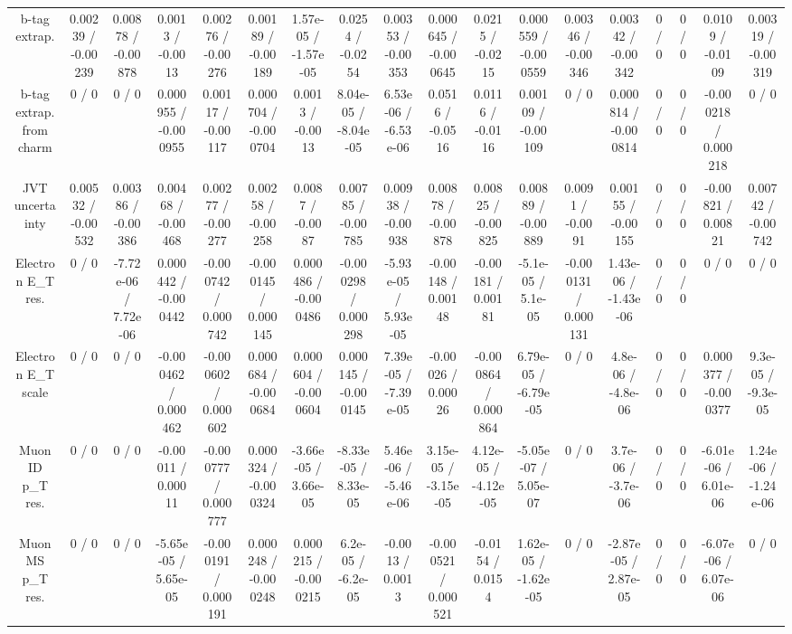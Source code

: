 \documentclass[10pt]{article}
\begin{document}
\begin{table}[htbp]
\begin{center}
\begin{tabular}{|c|c|c|c|c|c|c|c|c|c|c|c|c|c|c|c|c|c|}
  b-tag extrap. & 0.00239 / -0.00239 & 0.00878 / -0.00878 & 0.0013 / -0.0013 & 0.00276 / -0.00276 & 0.00189 / -0.00189 & 1.57e-05 / -1.57e-05 & 0.0254 / -0.0254 & 0.00353 / -0.00353 & 0.000645 / -0.000645 & 0.0215 / -0.0215 & 0.000559 / -0.000559 & 0.00346 / -0.00346 & 0.00342 / -0.00342 & 0 / 0 & 0 / 0 & 0.0109 / -0.0109 & 0.00319 / -0.00319 \\ 
  b-tag extrap. from charm & 0 / 0 & 0 / 0 & 0.000955 / -0.000955 & 0.00117 / -0.00117 & 0.000704 / -0.000704 & 0.0013 / -0.0013 & 8.04e-05 / -8.04e-05 & 6.53e-06 / -6.53e-06 & 0.0516 / -0.0516 & 0.0116 / -0.0116 & 0.00109 / -0.00109 & 0 / 0 & 0.000814 / -0.000814 & 0 / 0 & 0 / 0 & -0.000218 / 0.000218 & 0 / 0 \\ 
  JVT uncertainty & 0.00532 / -0.00532 & 0.00386 / -0.00386 & 0.00468 / -0.00468 & 0.00277 / -0.00277 & 0.00258 / -0.00258 & 0.0087 / -0.0087 & 0.00785 / -0.00785 & 0.00938 / -0.00938 & 0.00878 / -0.00878 & 0.00825 / -0.00825 & 0.00889 / -0.00889 & 0.0091 / -0.0091 & 0.00155 / -0.00155 & 0 / 0 & 0 / 0 & -0.00821 / 0.00821 & 0.00742 / -0.00742 \\ 
  Electron E_{T} res. & 0 / 0 & -7.72e-06 / 7.72e-06 & 0.000442 / -0.000442 & -0.000742 / 0.000742 & -0.000145 / 0.000145 & 0.000486 / -0.000486 & -0.000298 / 0.000298 & -5.93e-05 / 5.93e-05 & -0.00148 / 0.00148 & -0.00181 / 0.00181 & -5.1e-05 / 5.1e-05 & -0.000131 / 0.000131 & 1.43e-06 / -1.43e-06 & 0 / 0 & 0 / 0 & 0 / 0 & 0 / 0 \\ 
  Electron E_{T} scale & 0 / 0 & 0 / 0 & -0.000462 / 0.000462 & -0.000602 / 0.000602 & 0.000684 / -0.000684 & 0.000604 / -0.000604 & 0.000145 / -0.000145 & 7.39e-05 / -7.39e-05 & -0.00026 / 0.00026 & -0.000864 / 0.000864 & 6.79e-05 / -6.79e-05 & 0 / 0 & 4.8e-06 / -4.8e-06 & 0 / 0 & 0 / 0 & 0.000377 / -0.000377 & 9.3e-05 / -9.3e-05 \\ 
  Muon ID p_{T} res. & 0 / 0 & 0 / 0 & -0.00011 / 0.00011 & -0.000777 / 0.000777 & 0.000324 / -0.000324 & -3.66e-05 / 3.66e-05 & -8.33e-05 / 8.33e-05 & 5.46e-06 / -5.46e-06 & 3.15e-05 / -3.15e-05 & 4.12e-05 / -4.12e-05 & -5.05e-07 / 5.05e-07 & 0 / 0 & 3.7e-06 / -3.7e-06 & 0 / 0 & 0 / 0 & -6.01e-06 / 6.01e-06 & 1.24e-06 / -1.24e-06 \\ 
  Muon MS p_{T} res. & 0 / 0 & 0 / 0 & -5.65e-05 / 5.65e-05 & -0.000191 / 0.000191 & 0.000248 / -0.000248 & 0.000215 / -0.000215 & 6.2e-05 / -6.2e-05 & -0.0013 / 0.0013 & -0.000521 / 0.000521 & -0.0154 / 0.0154 & 1.62e-05 / -1.62e-05 & 0 / 0 & -2.87e-05 / 2.87e-05 & 0 / 0 & 0 / 0 & -6.07e-06 / 6.07e-06 & 0 / 0 \\ 

\end{tabular}
\end{center}
\end{table}
\end{document}
